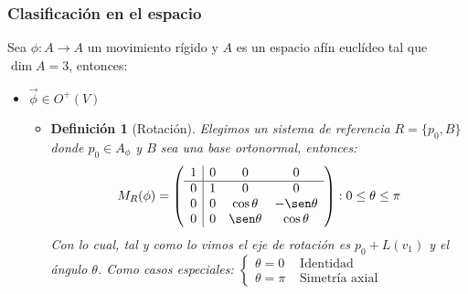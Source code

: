 \documentclass[10pt,a4paper,openright]{book}
\theoremstyle{break}
\newtheorem*{defi}{Definición}
\begin{document}
\subsubsection{Clasificación en el espacio}
Sea $\phi : A\rightarrow A$ un movimiento rígido y $A$ es un espacio afín euclídeo tal que $\dim A = 3$, entonces:
\begin{itemize}
\item $\boxed{\vec{\phi} \in O^+(V)}$
	\begin{itemize}
	\item {}
	
	\begin{defi}[Rotación]
	Elegimos un sistema de referencia $R=\{p_0, B\}$ donde $p_0 \in A_\phi$ y $B$ sea una base ortonormal, entonces:
	$$M_R (\phi) = \left(\begin{array}{c|ccc}
1 & 0  & 0 & 0 \\
\hline
0 & 1 &  0& 0    \\
0 & 0 &  \cos\theta  & -\sen\theta \\
0 & 0 &  \sen\theta & \cos\theta 
\end{array}
\right) : 0 \leq \theta \leq \pi$$
Con lo cual, tal y como lo vimos el eje de rotación es $p_0 + L(v_1)$ y el ángulo $\theta$. Como casos especiales: $\begin{cases} \theta = 0 & \mbox{ Identidad } \\ \theta = \pi & \mbox{ Simetría axial } \end{cases}$
	\end{defi}


\end{itemize}
\end{itemize}
\end{document}
